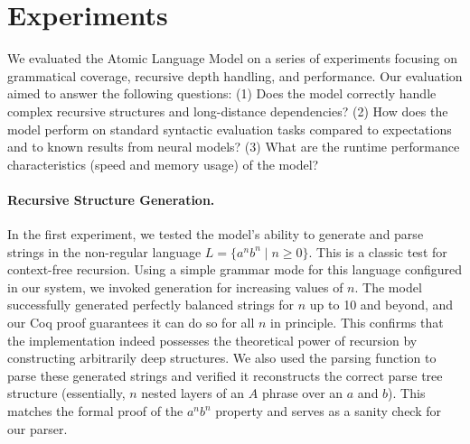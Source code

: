 \documentclass[11pt]{article}
\begin{document}
\section{Experiments}
We evaluated the Atomic Language Model on a series of experiments focusing on grammatical coverage, recursive depth handling, and performance. Our evaluation aimed to answer the following questions: (1) Does the model correctly handle complex recursive structures and long-distance dependencies? (2) How does the model perform on standard syntactic evaluation tasks compared to expectations and to known results from neural models? (3) What are the runtime performance characteristics (speed and memory usage) of the model?

\paragraph{Recursive Structure Generation.} In the first experiment, we tested the model's ability to generate and parse strings in the non-regular language $L = \{a^n b^n \mid n \ge 0\}$. This is a classic test for context-free recursion. Using a simple grammar mode for this language configured in our system, we invoked generation for increasing values of $n$. The model successfully generated perfectly balanced strings for $n$ up to 10 and beyond, and our Coq proof guarantees it can do so for all $n$ in principle. This confirms that the implementation indeed possesses the theoretical power of recursion by constructing arbitrarily deep structures. We also used the parsing function to parse these generated strings and verified it reconstructs the correct parse tree structure (essentially, $n$ nested layers of an $A$ phrase over an $a$ and $b$). This matches the formal proof of the $a^n b^n$ property and serves as a sanity check for our parser.
\end{document}
